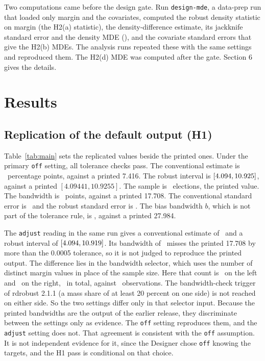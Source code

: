 \documentclass[11pt]{article}
\begin{document}
Two computations came before the design gate. Run \texttt{design-mde}, a data-prep run that loaded only margin and the covariates, computed the robust density statistic on margin (the H2(a) statistic), the density-difference estimate, its jackknife standard error and the density MDE (\RdDensityMde), and the covariate standard errors that give the H2(b) MDEs. The analysis runs repeated these with the same settings and reproduced them. The H2(d) MDE was computed after the gate. Section 6 gives the details.

\section{Results}

\subsection{Replication of the default output (H1)}

Table~\ref{tab:main} sets the replicated values beside the printed ones. Under the primary \texttt{off} setting, all tolerance checks pass. The conventional estimate is \RdEffect\ percentage points, against a printed 7.416. The robust interval is $[4.094, 10.925]$, against a printed $[4.09441, 10.9255]$. The sample is \RdN\ elections, the printed value. The bandwidth is \RdBw\ points, against a printed 17.708. The conventional standard error is \RdSe\ and the robust standard error is \RdRobustSe. The bias bandwidth $b$, which is not part of the tolerance rule, is \RdB, against a printed 27.984.

The \texttt{adjust} reading in the same run gives a conventional estimate of \RdAdjEffect\ and a robust interval of $[4.094, 10.919]$. Its bandwidth of \RdAdjBw\ misses the printed 17.708 by more than the 0.0005 tolerance, so it is not judged to reproduce the printed output. The difference lies in the bandwidth selector, which uses the number of distinct margin values in place of the sample size. Here that count is \RdAdjMLeft\ on the left and \RdAdjMRight\ on the right, \RdDistinctTotal\ in total, against \RdN\ observations. The bandwidth-check trigger of rdrobust 2.1.1 (a mass share of at least 20 percent on one side) is not reached on either side. So the two settings differ only in that selector input. Because the printed bandwidths are the output of the earlier release, they discriminate between the settings only as evidence. The \texttt{off} setting reproduces them, and the \texttt{adjust} setting does not. That agreement is consistent with the \texttt{off} assumption. It is not independent evidence for it, since the Designer chose \texttt{off} knowing the targets, and the H1 pass is conditional on that choice.
\end{document}
